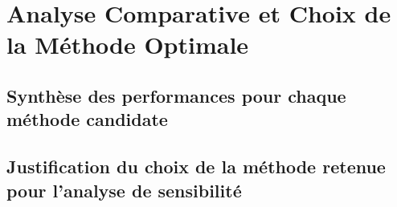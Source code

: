 \section{Analyse Comparative et Choix de la Méthode Optimale}
    \subsection{Synthèse des performances pour chaque méthode candidate}
    \subsection{Justification du choix de la méthode retenue pour l'analyse de sensibilité}






